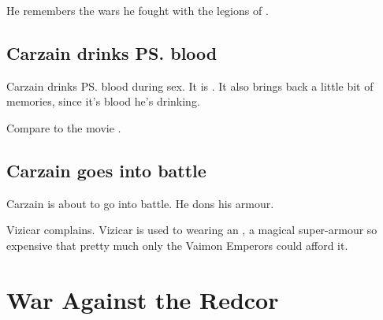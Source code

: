 \begin{garbage}
He remembers the wars he fought with the legions of \Mystraacht. 










\subsection{Carzain drinks \ps{\Belzir}{} blood}
Carzain drinks \ps{\Belzir}{} blood during sex. 
It is . 
It also brings back a little bit of \resphan{} memories, since it's \sathariah{} \Malach{} blood he's drinking. 

Compare to the movie \cite{Movie:QueenoftheDamned}. 







\subsection{Carzain goes into battle}
Carzain is about to go into battle. He dons his armour. 

Vizicar complains. 
Vizicar is used to wearing an , a magical super-armour so expensive that pretty much only the Vaimon Emperors could afford it. 















\section{War Against the Redcor}

\end{garbage}
